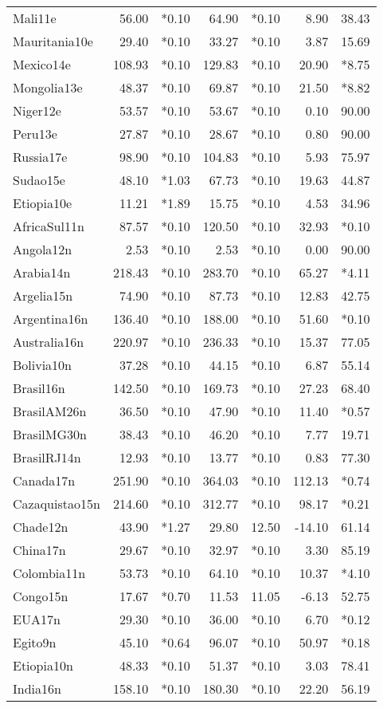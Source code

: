 \begin{landscape}
\begin{table}[htb]
{\begin{tabular}{@{}l|rr|rr|rr@{}}
Mali11e&56.00&*0.10&64.90&*0.10&8.90&38.43\\
Mauritania10e&29.40&*0.10&33.27&*0.10&3.87&15.69\\
Mexico14e&108.93&*0.10&129.83&*0.10&20.90&*8.75\\
Mongolia13e&48.37&*0.10&69.87&*0.10&21.50&*8.82\\
Niger12e&53.57&*0.10&53.67&*0.10&0.10&90.00\\
Peru13e&27.87&*0.10&28.67&*0.10&0.80&90.00\\
Russia17e&98.90&*0.10&104.83&*0.10&5.93&75.97\\
Sudao15e&48.10&*1.03&67.73&*0.10&19.63&44.87\\
Etiopia10e&11.21&*1.89&15.75&*0.10&4.53&34.96\\
AfricaSul11n&87.57&*0.10&120.50&*0.10&32.93&*0.10\\
Angola12n&2.53&*0.10&2.53&*0.10&0.00&90.00\\
Arabia14n&218.43&*0.10&283.70&*0.10&65.27&*4.11\\
Argelia15n&74.90&*0.10&87.73&*0.10&12.83&42.75\\
Argentina16n&136.40&*0.10&188.00&*0.10&51.60&*0.10\\
Australia16n&220.97&*0.10&236.33&*0.10&15.37&77.05\\
Bolivia10n&37.28&*0.10&44.15&*0.10&6.87&55.14\\
Brasil16n&142.50&*0.10&169.73&*0.10&27.23&68.40\\
BrasilAM26n&36.50&*0.10&47.90&*0.10&11.40&*0.57\\
BrasilMG30n&38.43&*0.10&46.20&*0.10&7.77&19.71\\
BrasilRJ14n&12.93&*0.10&13.77&*0.10&0.83&77.30\\
Canada17n&251.90&*0.10&364.03&*0.10&112.13&*0.74\\
Cazaquistao15n&214.60&*0.10&312.77&*0.10&98.17&*0.21\\
Chade12n&43.90&*1.27&29.80&12.50&-14.10&61.14\\
China17n&29.67&*0.10&32.97&*0.10&3.30&85.19\\
Colombia11n&53.73&*0.10&64.10&*0.10&10.37&*4.10\\
Congo15n&17.67&*0.70&11.53&11.05&-6.13&52.75\\
EUA17n&29.30&*0.10&36.00&*0.10&6.70&*0.12\\
Egito9n&45.10&*0.64&96.07&*0.10&50.97&*0.18\\
Etiopia10n&48.33&*0.10&51.37&*0.10&3.03&78.41\\
India16n&158.10&*0.10&180.30&*0.10&22.20&56.19\\

\end{tabular}}
\end{table}
\end{landscape}
